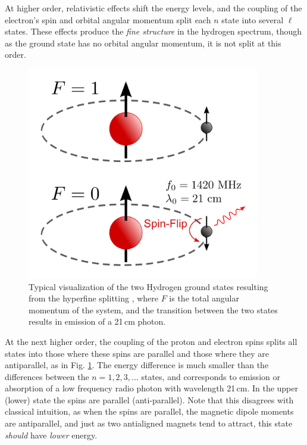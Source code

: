 At higher order, relativistic effects shift the energy levels, and the coupling of the electron's spin and orbital angular momentum split each $n$ state into several $\ell$ states. These effects produce the \textit{fine structure} in the hydrogen spectrum, though as the ground state has no orbital angular momentum, it is not split at this order. 

\begin{figure}
	\centering
	\includegraphics[width=4in]{chap0_intro/500px-Hydrogen-SpinFlip.png}
	\caption[Diagram of the two Hydrogen ground states resulting from hyperfine splitting.]{Typical visualization of the two Hydrogen ground states resulting from the hyperfine splitting \citep{HydrogenSpinFlipGraphic}, where $F$ is the total angular momentum of the system, and the transition between the two states results in emission of a 21\,cm photon.}
	\label{fig:HydrogenSpinFlipGraphic}
\end{figure}

At the next higher order, the coupling of the proton and electron spins splits all states into those where these spins are parallel and those where they are antiparallel, as in Fig. \ref{fig:HydrogenSpinFlipGraphic}. The energy difference is much smaller than the differences between the $n=1,2,3,...$ states, and corresponds to emission or absorption of a low frequency radio photon with wavelength 21\,cm. In the upper (lower) state the spins are parallel (anti-parallel). Note that this disagrees with classical intuition, as when the spins are parallel, the magnetic dipole moments are antiparallel, and just as two antialigned magnets tend to attract, this state \textit{should} have \textit{lower} energy. 


